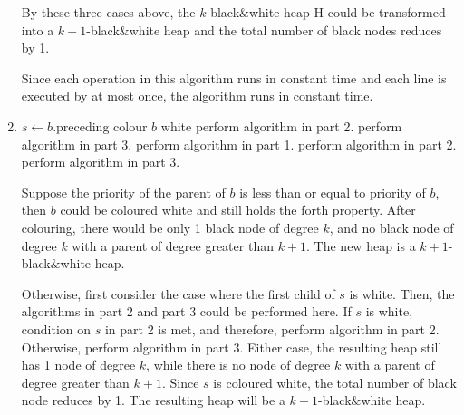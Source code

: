 \documentclass[10pt]{article}
\begin{document}
\begin{enumerate}
		By these three cases above, the $k$-black$\&$white heap H could be
		transformed into a $k+1$-black$\&$white heap and the total number of
		black nodes reduces by 1.

		Since each operation in this algorithm runs in constant time and each
		line is executed by at most once, the algorithm runs in constant time.

	\item
	\begin{comment}
		Suppose you have a linked-list H of binomial trees that satisfies all
		the properties of a black$&$white heap except that it had one black node
		$b$ of degree $k$ whose parent has degree greater than $k+1$ and
		another black node of degree $k$ whose parent has degree $k+1$.
		Given pointers to $b$ and its sibling $s$ of degree $k+1$, explain how
		to transform H in constant time into a k'-black$&$white heap with the
		same set of nodes, for some $k' > k$.
	\end{comment}
		
		\begin{algorithmic}[1]
			\State $s \gets b$.preceding
				\State colour $b$ white
					\State perform algorithm in part 2.
				\Else
					\State perform algorithm in part 3.
				\EndIf
			\Else
				\State perform algorithm in part 1.
						\State perform algorithm in part 2.
					\Else
						\State perform algorithm in part 3.
					\EndIf
				\EndIf
			\EndIf
		\end{algorithmic}

		Suppose the priority of the parent of $b$ is less than or equal to
		priority of $b$, then $b$ could be coloured white and still holds the
		forth property.
		After colouring, there would be only 1 black node of degree $k$, and
		no black node of degree $k$ with a parent of degree greater than $k+1$.
		The new heap is a $k+1$-black$\&$white heap.

		Otherwise, first consider the case where the first child of $s$ is
		white. 
		Then, the algorithms in part 2 and part 3 could be performed here. 
		If $s$ is white, condition on $s$ in part 2 is met, and therefore,
		perform algorithm in part 2.
		Otherwise, perform algorithm in part 3.
		Either case, the resulting heap still has 1 node of degree $k$, while
		there is no node of degree $k$ with a parent of degree greater than
		$k+1$.
		Since $s$ is coloured white, the total number of black node reduces by
		1.
		The resulting heap will be a $k+1$-black$\&$white heap.


\end{enumerate}
\end{document}
